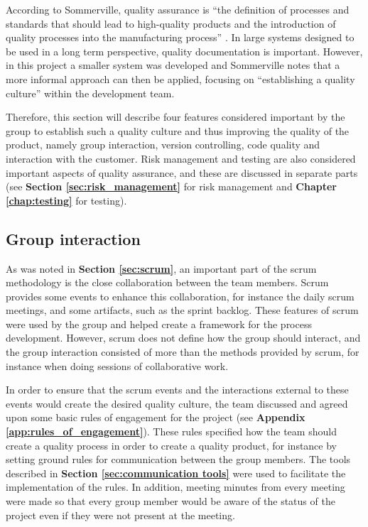 According to Sommerville, quality assurance is “the definition of processes and standards that should lead to high-quality products and the introduction of quality processes into the manufacturing process” \cite[p.652]{Sommerville}. In large systems designed to be used in a long term perspective, quality documentation is important. However, in this project a smaller system was developed and Sommerville notes that a more informal approach can then be applied, focusing on “establishing a quality culture” \cite[p.654]{Sommerville} within the development team.\newline

Therefore, this section will describe four features considered important by the group to establish such a quality culture and thus improving the quality of the product, namely group interaction, version controlling, code quality and interaction with the customer. Risk management and testing are also considered important aspects of quality assurance, and these are discussed in separate parts (see \textbf{Section \ref{sec:risk_management}} for risk management and \textbf{Chapter \ref{chap:testing}} for testing). 

\subsection{Group interaction}

As was noted in \textbf{Section \ref{sec:scrum}}, an important part of the scrum methodology is the close collaboration between the team members. Scrum provides some events to enhance this collaboration, for instance the daily scrum meetings, and some artifacts, such as the sprint backlog. These features of scrum were used by the group and helped create a framework for the process development. However, scrum does not define how the group should interact, and the group interaction consisted of more than the methods provided by scrum, for instance when doing sessions of collaborative work.\newline

In order to ensure that the scrum events and the interactions external to these events would create the desired quality culture, the team discussed and agreed upon some basic rules of engagement for the project (see \textbf{Appendix \ref{app:rules_of_engagement}}). These rules specified how the team should create a quality process in order to create a quality product, for instance by setting ground rules for communication between the group members. The tools described in \textbf{Section \ref{sec:communication tools}} were used to facilitate the implementation of the rules. In addition, meeting minutes from every meeting were made so that every group member would be aware of the status of the project even if they were not present at the meeting.\newline

